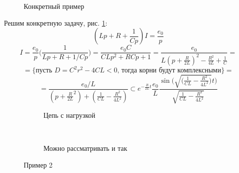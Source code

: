\begin{figure}[h]
	\caption{Конкретный пример}
	\label{ch14KP}

\end{figure}

Решим конкретную задачу, рис. \ref{ch14KP}:
$$ (Lp + R + \frac{1}{Cp})I = \frac{e_0}{p} $$
$$ I = \frac{e_0}{p}\Big (\frac{1}{Lp + R + 1/Cp} \Big ) =\frac{e_0 C}{CLp^2 + RCp + 1} = \frac{e_0}{L(p + \frac{R}{2L})^2 - \frac{R^2}{4L} + \frac{1}{C}} =$$
$$ =\Big \{  \text{пусть } D = C^2 r^2 - 4 CL <0 \text{, тогда корни будут комплексными}    \Big \} = $$
$$ = \frac{e_0 /L}{(p + \frac{R}{2 L}^2) + (\frac{1}{CL} - \frac{R^2}{4L^2})} \subset e^{-\frac{R}{2L}t} \frac{e_0}{L} \frac{\sin \Big( \sqrt{\big (\frac{1}{CL} - \frac{R^2}{4L^2} \big )}  t \Big) }{\sqrt{\frac{1}{CL} - \frac{R^2}{4L^2}}} $$

\begin{figure}[h]
	\centering
	
	\begin{subfigure}[t]{0.4\textwidth}
	\caption{ Цепь с нагрузкой}\label{ch14ex2}
	\end{subfigure}
	~ ~ ~ ~               
	\begin{subfigure}[t]{0.4\textwidth}
	\caption{Можно рассматривать и так}
	\end{subfigure}
	
	\caption{Пример 2}\label{ch14ex}
\end{figure}


